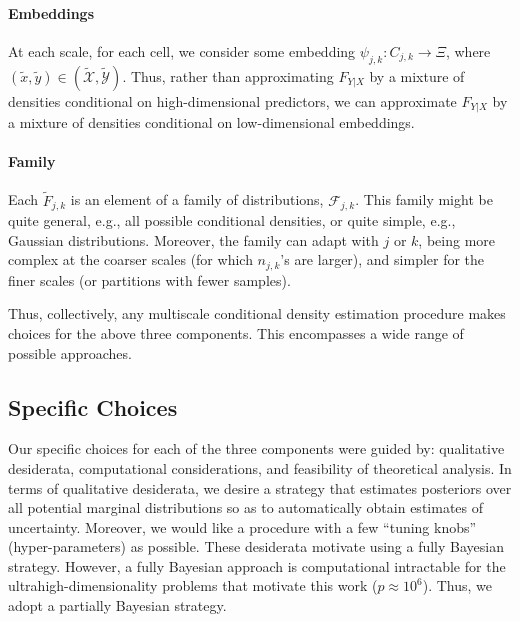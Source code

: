 \documentclass{article} %
\providecommand{\mh}[1]{\hat{#1}}
\providecommand{\mc}[1]{\mathcal{#1}}
\providecommand{\mt}[1]{\widetilde{#1}}
\newcommand{\from}{{\ensuremath{\colon}}}  %
\newcommand{\ZZ}{\mathbb{Z}}
\providecommand{\mtc}[1]{\widetilde{\mathcal{#1}}}
\begin{document}
 

\paragraph{Embeddings}
At each scale, for each cell, we consider some embedding $\psi_{j,k} \from C_{j,k} \to \Xi$, where $(\mt{x},\mt{y}) \in (\mtc{X}, \mtc{Y})$.  Thus, rather than approximating $F_{Y|X}$ by a mixture of densities conditional on high-dimensional predictors, we can approximate $F_{Y|X}$ by a mixture of densities conditional on low-dimensional embeddings. %

\paragraph{Family} Each $\mt{F}_{j,k}$ is an element of a family of distributions, $\mc{F}_{j,k}$.  This family might be quite general, e.g., all possible conditional densities, or quite simple, e.g., Gaussian distributions.  Moreover, the family can adapt with $j$ or $k$, being more complex at the coarser scales (for which $n_{j,k}$'s are larger), and simpler for the finer scales (or partitions with fewer samples).


Thus, collectively, any multiscale conditional density estimation procedure makes choices for the above three components.  This encompasses a wide range of possible approaches. 



\subsection{Specific Choices} \label{sub:spec}

Our specific choices for each of the three components were guided by: qualitative desiderata, computational considerations, and feasibility of theoretical analysis.  In terms of qualitative desiderata, we desire a strategy that estimates posteriors over all potential marginal distributions so as to automatically obtain estimates of uncertainty.  Moreover, we would like a procedure with a few ``tuning knobs'' (hyper-parameters) as possible.  These desiderata motivate using a fully Bayesian strategy.  
However, a fully Bayesian approach is computational intractable for the ultrahigh-dimensionality problems that motivate this work ($ p \approx 10^6$).  Thus, we adopt a partially Bayesian strategy.  
\end{document}
